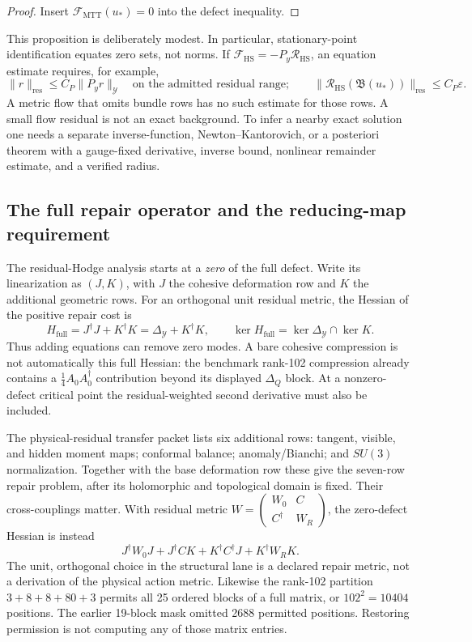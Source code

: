 \documentclass[11pt]{article}
\theoremstyle{definition}
\theoremstyle{remark}
\newcommand{\cF}{\mathcal F}
\newcommand{\cR}{\mathcal R}
\newcommand{\cY}{\mathcal Y}
\begin{document}
\begin{proof}
Insert \(\cF_{\mathrm{MTT}}(u_\ast)=0\) into the defect inequality.
\end{proof}

This proposition is deliberately modest.  In particular, stationary-point
identification equates zero sets, not norms.  If
\(\cF_{\mathrm{HS}}=-P_y\cR_{\mathrm{HS}}\), an equation estimate requires,
for example,
\[
\|r\|_{\mathrm{res}}\le C_P\|P_y r\|_{\cY}
\quad\text{on the admitted residual range};\qquad
\|\cR_{\mathrm{HS}}(\mathfrak B(u_*))\|_{\mathrm{res}}
\le C_P\varepsilon.
\]
A metric flow that omits bundle rows has no such estimate for those rows.
A small flow residual is not an exact background.  To infer a nearby exact
solution one needs a separate
inverse-function, Newton--Kantorovich, or a posteriori theorem with a
gauge-fixed derivative, inverse bound, nonlinear remainder estimate, and a
verified radius.

\subsection{The full repair operator and the reducing-map requirement}
\label{sec:full-repair}

The residual-Hodge analysis \cite{FRG2} starts at a \emph{zero} of the full
defect.  Write its linearization as \((J,K)\), with \(J\) the cohesive
deformation row and \(K\) the additional geometric rows.  For an orthogonal
unit residual metric, the Hessian of the positive repair cost is
\begin{equation}
 H_{\mathrm{full}}=J^\dagger J+K^\dagger K
 =\Delta_{\cY}+K^\dagger K,\qquad
 \ker H_{\mathrm{full}}=\ker\Delta_{\cY}\cap\ker K.
 \label{eq:full-repair}
\end{equation}
Thus adding equations can remove zero modes.  A bare cohesive compression is
not automatically this full Hessian: the benchmark rank-102 compression
already contains a \(\tfrac14 A_0A_0^\dagger\) contribution beyond its
displayed \(\Delta_Q\) block.  At a nonzero-defect critical point the
residual-weighted second derivative must also be included.

The physical-residual transfer packet \cite{FRG2P} lists six additional rows:
tangent, visible, and hidden moment maps; conformal balance; anomaly/Bianchi;
and \(SU(3)\) normalization.  Together with the base deformation row these
give the seven-row repair problem, after its holomorphic and topological
domain is fixed.  Their cross-couplings matter.  With residual metric
\(W=\left(\begin{smallmatrix}W_0&C\\C^\dagger&W_R\end{smallmatrix}\right)\),
the zero-defect Hessian is instead
\[
J^\dagger W_0J+J^\dagger CK+K^\dagger C^\dagger J+K^\dagger W_RK.
\]
The unit, orthogonal choice in the structural lane is a declared repair
metric, not a derivation of the physical action metric.  Likewise the
rank-102 partition \(3+8+8+80+3\) permits all 25 ordered blocks of a full
matrix, or \(102^2=10404\) positions.  The earlier 19-block mask omitted
2688 permitted positions.  Restoring permission is not computing any of
those matrix entries.
\end{document}
